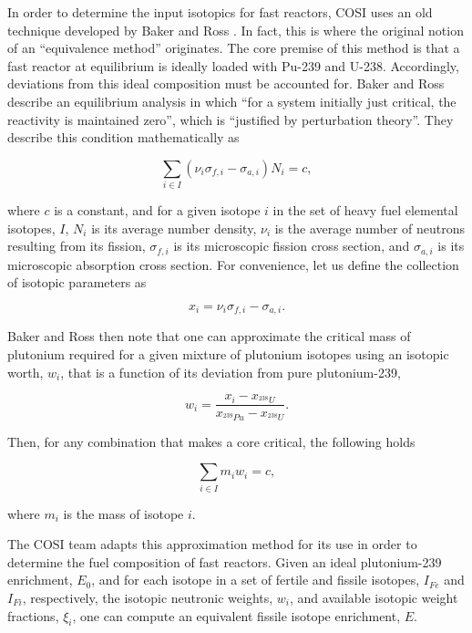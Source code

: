 In order to determine the input isotopics for fast reactors, COSI uses an old
technique developed by Baker and Ross \cite{baker_comparison_1963}. In fact,
this is where the original notion of an ``equivalence method'' originates. The
core premise of this method is that a fast reactor at equilibrium is ideally
loaded with Pu-239 and U-238. Accordingly, deviations from this ideal
composition must be accounted for. Baker and Ross describe an equilibrium
analysis in which ``for a system initially just critical, the reactivity is
maintained zero'', which is ``justified by perturbation theory''. They describe
this condition mathematically as

\begin{equation*}
\sum_{i \in I} \left( \nu_{i} \sigma_{f,i} - \sigma_{a,i} \right) N_i = c,
\end{equation*}

where $c$ is a constant, and for a given isotope $i$ in the set of heavy fuel
elemental isotopes, $I$, $N_i$ is its average number density, $\nu_{i}$ is the
average number of neutrons resulting from its fission, $\sigma_{f,i}$ is its
microscopic fission cross section, and $\sigma_{a,i}$ is its microscopic
absorption cross section. For convenience, let us define the collection of
isotopic parameters as

\begin{equation*}
x_i = \nu_{i} \sigma_{f,i} - \sigma_{a,i}.
\end{equation*}

Baker and Ross then note that one can approximate the critical mass of plutonium
required for a given mixture of plutonium isotopes using an isotopic worth,
$w_i$, that is a function of its deviation from pure plutonium-239,

\begin{equation*}
w_i = \frac{x_i - x_{^{238}U}}
           {x_{^{239}Pu} - x_{^{238}U}}.
\end{equation*}

Then, for any combination that makes a core critical, the following holds

\begin{equation*}
\sum_{i \in I} m_i w_i = c,
\end{equation*}

where $m_i$ is the mass of isotope $i$.

The COSI team adapts this approximation method for its use in order to determine
the fuel composition of fast reactors. Given an ideal plutonium-239 enrichment,
$E_0$, and for each isotope in a set of fertile and fissile isotopes, $I_{Fe}$
and $I_{Fi}$, respectively, the isotopic neutronic weights, $w_i$, and available
isotopic weight fractions, $\xi_i$, one can compute an equivalent fissile
isotope enrichment, $E$.

